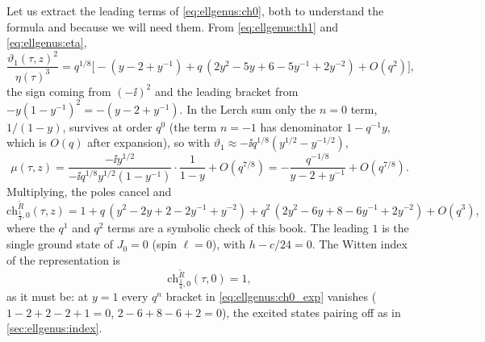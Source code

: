 Let us extract the leading terms of \eqref{eq:ellgenus:ch0}, both to understand the
formula and because we will need them. From \eqref{eq:ellgenus:th1} and
\eqref{eq:ellgenus:eta},
\begin{equation}\label{eq:ellgenus:massive_core}
 \frac{\vartheta_1(\tau,z)^2}{\eta(\tau)^3}
 =q^{1/8}\Big[-(y-2+y^{-1})+q\,(2y^2-5y+6-5y^{-1}+2y^{-2})+O(q^2)\Big],
\end{equation}
the sign coming from $(-\ii)^2$ and the leading bracket from
$-y(1-y^{-1})^2=-(y-2+y^{-1})$. In the Lerch sum only the $n=0$ term, $1/(1-y)$, survives
at order $q^0$ (the term $n=-1$ has denominator $1-q^{-1}y$, which is $O(q)$ after
expansion), so with $\vartheta_1\approx-\ii q^{1/8}(y^{1/2}-y^{-1/2})$,
\begin{equation}\label{eq:ellgenus:mu_lead}
 \mu(\tau,z)=\frac{-\ii y^{1/2}}{-\ii q^{1/8}y^{1/2}(1-y^{-1})}\cdot\frac1{1-y}+O(q^{7/8})
 =-\frac{q^{-1/8}}{y-2+y^{-1}}+O(q^{7/8}).
\end{equation}
Multiplying, the poles cancel and
\begin{equation}\label{eq:ellgenus:ch0_exp}
 \mathrm{ch}^{\tilde R}_{\frac14,0}(\tau,z)
 =1+q\,(y^2-2y+2-2y^{-1}+y^{-2})+q^2\,(2y^2-6y+8-6y^{-1}+2y^{-2})+O(q^3),
\end{equation}
where the $q^1$ and $q^2$ terms are a symbolic check of this book. The leading $1$ is the
single ground state of $J_0=0$ (spin $\ell=0$), with $h-c/24=0$. The Witten index of the
representation is 
\begin{equation}\label{eq:ellgenus:ch0_index}
 \mathrm{ch}^{\tilde R}_{\frac14,0}(\tau,0)=1 ,
\end{equation}
as it must be: at $y=1$ every $q^n$ bracket in \eqref{eq:ellgenus:ch0_exp} vanishes
($1-2+2-2+1=0$, $2-6+8-6+2=0$), the excited states pairing off as in
\cref{sec:ellgenus:index}.

